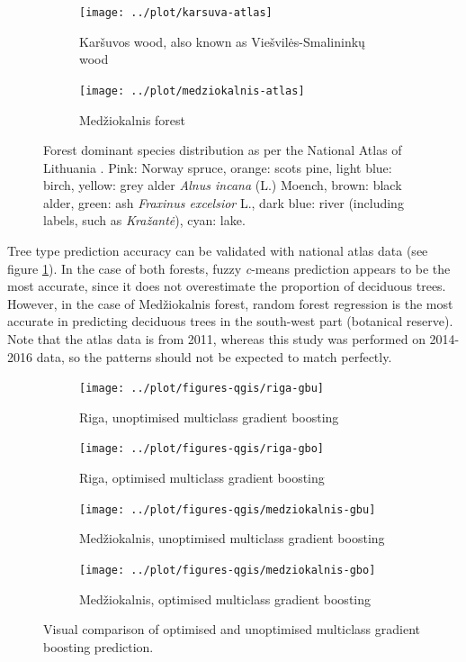 \documentclass[a4paper,10pt]{book}
\begin{document}
\begin{figure}
  \centering
  \begin{subfigure}[b]{0.48\textwidth}
    \texttt{[image: ../plot/karsuva-atlas]}
    \caption{Kar\v{s}uvos wood, also known as Vie\v{s}vil\.{e}s-Smalinink\k{u} wood}
  \end{subfigure} \hfill
  \begin{subfigure}[b]{0.48\textwidth}
    \texttt{[image: ../plot/medziokalnis-atlas]}
    \caption{Med\v{z}iokalnis forest}
  \end{subfigure}
  \caption{Forest dominant species distribution as per the National Atlas of Lithuania \citep{treeatlas2011}. Pink: Norway spruce, orange: scots pine, light blue: birch, yellow: grey alder \textit{Alnus incana} (L.) Moench, brown: black alder, green: ash \textit{Fraxinus excelsior} L., dark blue: river (including labels, such as \textit{Kra\v{z}ant\.{e}}), cyan: lake.}
  \label{fig-atlas-forest}
\end{figure}

Tree type prediction accuracy can be validated with national atlas data (see figure \ref{fig-atlas-forest}). In the case of both forests, fuzzy \textit{c}-means prediction appears to be the most accurate, since it does not overestimate the proportion of deciduous trees. However, in the case of Med\v{z}iokalnis forest, random forest regression is the most accurate in predicting deciduous trees in the south-west part (botanical reserve). Note that the atlas data is from 2011, whereas this study was performed on 2014-2016 data, so the patterns should not be expected to match perfectly.

\begin{figure}
  \centering
  \begin{subfigure}[b]{0.48\textwidth}
    \texttt{[image: ../plot/figures-qgis/riga-gbu]}
    \caption{Riga, unoptimised multiclass gradient boosting}
  \end{subfigure} \hfill
  \begin{subfigure}[b]{0.48\textwidth}
    \texttt{[image: ../plot/figures-qgis/riga-gbo]}
    \caption{Riga, optimised multiclass gradient boosting}
  \end{subfigure}
  \begin{subfigure}[b]{0.48\textwidth}
    \texttt{[image: ../plot/figures-qgis/medziokalnis-gbu]}
    \caption{Med\v{z}iokalnis, unoptimised multiclass gradient boosting}
  \end{subfigure} \hfill
  \begin{subfigure}[b]{0.48\textwidth}
    \texttt{[image: ../plot/figures-qgis/medziokalnis-gbo]}
    \caption{Med\v{z}iokalnis, optimised multiclass gradient boosting}
  \end{subfigure}
  \caption{Visual comparison of optimised and unoptimised multiclass gradient boosting prediction.}
  \label{fig-gradientboost-comparison}
\end{figure}
\end{document}

